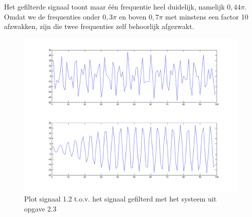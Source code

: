 \documentclass{article}
\begin{document}
Het gefilterde signaal toont maar \'e\'en frequentie heel duidelijk, namelijk $0,44 \pi$. Omdat we de frequenties onder $0,3 \pi$ en boven $0,7 \pi$ met minstens een factor 10 afzwakken, zijn die twee frequenties zelf behoorlijk afgezwakt.

\begin{figure}[h]
	\includegraphics[width=1\textwidth]{content/2_4.png}
	\caption{Plot signaal 1.2 t.o.v. het signaal gefilterd met het systeem uit opgave 2.3}
	\label{fig:opgave2_4}
\end{figure}
\end{document}
